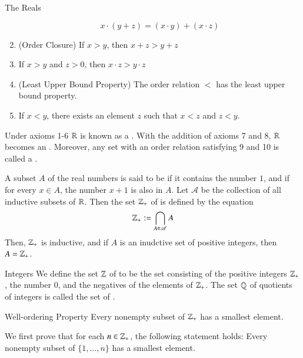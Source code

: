 \documentclass[12pt, a4paper, twoside, openright, titlepage]{book}
\begin{document}
\begin{appendices}
\begin{cons}{The Reals}{}
\begin{enumerate}
\begin{equation}
                    x\cdot (y+z) = (x\cdot y) + (x\cdot z)
                \end{equation}
            \item (Order Closure) If $x > y$, then $x+z > y+z$
            \item If $x > y$ and $z > 0$, then $x\cdot z > y\cdot z$
            \item (Least Upper Bound Property) The order relation $<$ has the least upper bound property.
            \item If $x < y$, there exists an element $z$ such that $x < z$ and $z < y$.
        \end{enumerate}
        Under axioms 1-6 $\mathbb R$ is known as a . With the addition of axioms 7 and 8, $\mathbb R$ becomes an . Moreover, any set with an order relation satisfying 9 and 10 is called a .
    \end{cons}

    \begin{defn}{}{}
        A subset $A$ of the real numbers is said to be  if it contains the number $1$, and if for every $x \in A$, the number $x+1$ is also in $A$. Let $\mathscr{A}$ be the collection of all inductive subsets of $\mathbb R$. Then the set $\mathbb Z_{+}$ of  is defined by the equation \begin{equation}
            \mathbb Z_+ := \bigcap\limits_{A\in\mathscr{A}}A
        \end{equation}
        Then, $\mathbb Z_+$ is inductive, and if $A$ is an inudctive set of positive integers, then $A = \mathbb Z_+$.
    \end{defn}

    \begin{defn}{Integers}{}
        We define the set $\mathbb Z$ of  to be the set consisting of the positive integers $\mathbb Z_+$, the number $0$, and the negatives of the elements of $\mathbb Z_+$. The set $\mathbb Q$ of quotients of integers is called the set of .
    \end{defn}

    \begin{namthm}{Well-ordering Property}{}
        Every nonempty subset of $\mathbb Z_+$ has a smallest element.
    \end{namthm}
    \begin{proof*}{}{}
        We first prove that for each $n \in \mathbb Z_+$, the following statement holds: Every nonempty subset of $\{1,...,n\}$ has a smallest element.


\end{proof*}
\end{appendices}
\end{document}
